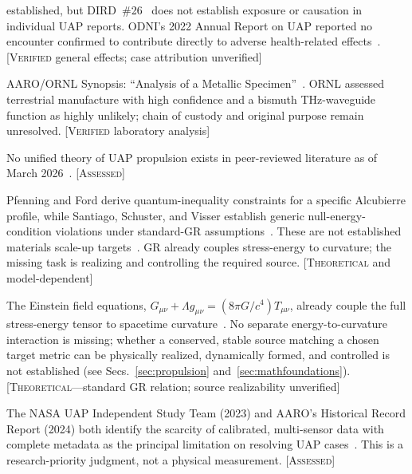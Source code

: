 \documentclass[aps,prd,twocolumn,superscriptaddress,nofootinbib,floatfix]{revtex4-2}
\begin{document}
\begin{description}
    established, but DIRD~\#26~\cite{DIRD_Green} does not establish exposure or
    causation in individual UAP reports. ODNI's 2022 Annual Report on UAP
    reported no encounter confirmed to contribute directly to adverse
    health-related effects~\cite{ODNI2023}. [\textsc{Verified} general effects;
    case attribution unverified]
  \item[KJ-8] AARO/ORNL Synopsis: ``Analysis of a Metallic
    Specimen''~\cite{AARO_ORNL2024}. ORNL assessed terrestrial manufacture with
    high confidence and a bismuth THz-waveguide function as highly unlikely; chain
    of custody and original purpose remain unresolved. [\textsc{Verified}
    laboratory analysis]
  \item[KJ-9] No unified theory of UAP propulsion exists in peer-reviewed
    literature as of March
    2026~\cite{Alcubierre1994,Lentz2021,SantiagoVisser2022,BobrickMartire2021,FellHeisenberg2021}.
    [\textsc{Assessed}]
  \item[KJ-10a] Pfenning and Ford derive quantum-inequality constraints for a
    specific Alcubierre profile, while Santiago, Schuster, and Visser establish
    generic null-energy-condition violations under standard-GR
    assumptions~\cite{PfenningFord1997,SantiagoVisser2022}. These are not
    established materials scale-up targets~\cite{Casimir1948,DIRD_Shvets}. GR
    already couples stress-energy to curvature; the missing task is realizing and
    controlling the required source. [\textsc{Theoretical} and model-dependent]
  \item[KJ-10b] The Einstein field equations,
    $G_{\mu\nu}+\Lambda g_{\mu\nu}=(8\pi G/c^{4})T_{\mu\nu}$, already couple the
    full stress-energy tensor to spacetime curvature~\cite{MTW1973,Wald1984}. No
    separate energy-to-curvature interaction is missing; whether a conserved,
    stable source matching a chosen target metric can be physically realized,
    dynamically formed, and controlled is not established (see
    Secs.~\ref{sec:propulsion} and~\ref{sec:mathfoundations}).
    [\textsc{Theoretical}---standard GR relation; source realizability
    unverified]
  \item[KJ-10c] The NASA UAP Independent Study Team (2023) and AARO's Historical
    Record Report (2024) both identify the scarcity of calibrated, multi-sensor
    data with complete metadata as the principal limitation on resolving UAP
    cases~\cite{NASA_UAP2023,AARO2024}. This is a research-priority judgment, not
    a physical measurement. [\textsc{Assessed}]
\end{description}
\end{document}
